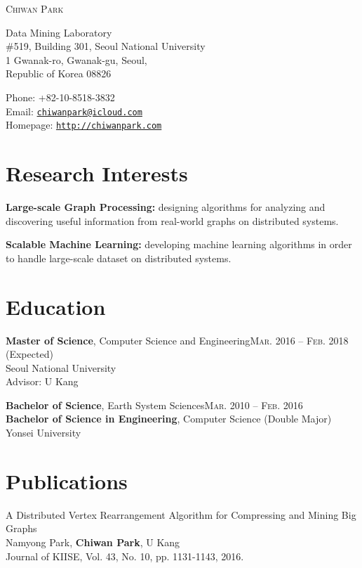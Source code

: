 \documentclass[11pt,a4paper]{article}
\makeatletter
\def\myname{Chiwan Park}
\def\myphone{+82-10-8518-3832}
\def\myaddress{Data Mining Laboratory\\
\#519, Building 301, Seoul National University\\
1 Gwanak-ro, Gwanak-gu, Seoul,\\
Republic of Korea 08826}
\def\myemail{chiwanpark@icloud.com}
\def\myhomepage{http://chiwanpark.com}
\renewenvironment{itemize}{
  \begin{list}{}{
    \setlength{\leftmargin}{1.5em}
    \setlength{\itemsep}{0.5em}
    \setlength{\parskip}{0pt}
    \setlength{\parsep}{0.25em}
  }
}{
  \end{list}
}
\makeatother
\begin{document}
\par{\Huge \textsc{\myname}}

\bigskip

\begin{minipage}[t]{0.495\textwidth}
  \myaddress
\end{minipage}
\begin{minipage}[t]{0.495\textwidth}
  Phone: \myphone \\
  Email: \href{mailto:\myemail}{\tt \myemail} \\
  Homepage: \href{\myhomepage}{\tt \myhomepage}
\end{minipage}

\section*{Research Interests}
\begin{itemize}
  \item \textbf{Large-scale Graph Processing:} designing algorithms for analyzing and discovering useful information from real-world graphs on distributed systems.
  \item \textbf{Scalable Machine Learning:} developing machine learning algorithms in order to handle large-scale dataset on distributed systems.
\end{itemize}

\section*{Education}
\begin{itemize}
  \item \textbf{Master of Science}, Computer Science and Engineering\hfill\textsc{Mar. 2016 -- Feb. 2018} (Expected)\\
        Seoul National University\\
        Advisor: U Kang
  \item \textbf{Bachelor of Science}, Earth System Sciences\hfill\textsc{Mar. 2010 -- Feb. 2016}\\
        \textbf{Bachelor of Science in Engineering}, Computer Science (Double Major)\\
        Yonsei University
\end{itemize}

\section*{Publications}
\begin{itemize}
	\item A Distributed Vertex Rearrangement Algorithm for Compressing and Mining Big Graphs \\
	Namyong Park, \textbf{Chiwan Park}, U Kang \\
	Journal of KIISE, Vol. 43, No. 10, pp. 1131-1143, 2016.
\end{itemize}
\end{document}
